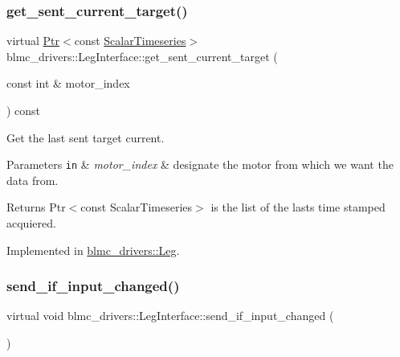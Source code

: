 \subsubsection{\texorpdfstring{get\+\_\+sent\+\_\+current\+\_\+target()}{get\_sent\_current\_target()}}
{\footnotesize\ttfamily virtual \hyperlink{classblmc__drivers_1_1LegInterface_ac5af9e6514abff5ee918813925a8e42d}{Ptr}$<$const \hyperlink{classblmc__drivers_1_1LegInterface_a57a35b64a76fb4225637828d1b1c35a6}{Scalar\+Timeseries}$>$ blmc\+\_\+drivers\+::\+Leg\+Interface\+::get\+\_\+sent\+\_\+current\+\_\+target (\begin{DoxyParamCaption}\item[{const int \&}]{motor\+\_\+index }\end{DoxyParamCaption}) const\hspace{0.3cm}{\ttfamily [pure virtual]}}



Get the last sent target current. 


\begin{DoxyParams}[1]{Parameters}
\mbox{\tt in}  & {\em motor\+\_\+index} & designate the motor from which we want the data from. \\
\hline
\end{DoxyParams}
\begin{DoxyReturn}{Returns}
Ptr$<$const Scalar\+Timeseries$>$ is the list of the lasts time stamped acquiered. 
\end{DoxyReturn}


Implemented in \hyperlink{classblmc__drivers_1_1Leg_a94760dbfc66ba22e68dfa8d89eec4c9f}{blmc\+\_\+drivers\+::\+Leg}.

\mbox{\label{classblmc__drivers_1_1LegInterface_aaf3d3759b63a3ffe7e9cee360302f9b7}} 
\subsubsection{\texorpdfstring{send\+\_\+if\+\_\+input\+\_\+changed()}{send\_if\_input\_changed()}}
{\footnotesize\ttfamily virtual void blmc\+\_\+drivers\+::\+Leg\+Interface\+::send\+\_\+if\+\_\+input\+\_\+changed (\begin{DoxyParamCaption}{ }\end{DoxyParamCaption})\hspace{0.3cm}{\ttfamily [pure virtual]}}



